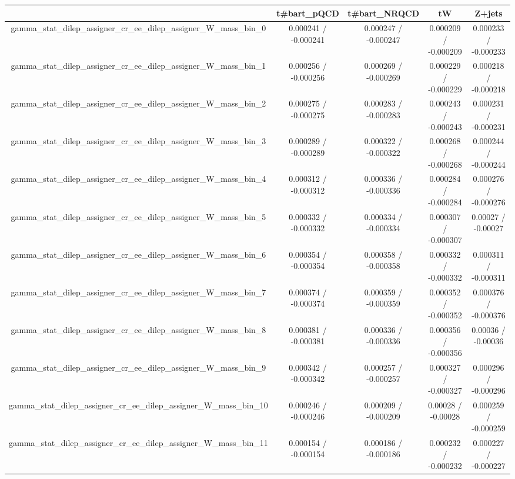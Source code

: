 \documentclass[10pt]{article}
\begin{document}
\begin{table}[htbp]
\begin{center}
\begin{tabular}{|c|c|c|c|c|}
\hline 
      & t#bar{t}_{pQCD}      & t#bar{t}_{NRQCD}      & tW      & Z+jets \\ 
\hline 
  gamma_stat_dilep_assigner_cr_ee_dilep_assigner_W_mass_bin_0 & 0.000241 / -0.000241 & 0.000247 / -0.000247 & 0.000209 / -0.000209 & 0.000233 / -0.000233 \\ 
  gamma_stat_dilep_assigner_cr_ee_dilep_assigner_W_mass_bin_1 & 0.000256 / -0.000256 & 0.000269 / -0.000269 & 0.000229 / -0.000229 & 0.000218 / -0.000218 \\ 
  gamma_stat_dilep_assigner_cr_ee_dilep_assigner_W_mass_bin_2 & 0.000275 / -0.000275 & 0.000283 / -0.000283 & 0.000243 / -0.000243 & 0.000231 / -0.000231 \\ 
  gamma_stat_dilep_assigner_cr_ee_dilep_assigner_W_mass_bin_3 & 0.000289 / -0.000289 & 0.000322 / -0.000322 & 0.000268 / -0.000268 & 0.000244 / -0.000244 \\ 
  gamma_stat_dilep_assigner_cr_ee_dilep_assigner_W_mass_bin_4 & 0.000312 / -0.000312 & 0.000336 / -0.000336 & 0.000284 / -0.000284 & 0.000276 / -0.000276 \\ 
  gamma_stat_dilep_assigner_cr_ee_dilep_assigner_W_mass_bin_5 & 0.000332 / -0.000332 & 0.000334 / -0.000334 & 0.000307 / -0.000307 & 0.00027 / -0.00027 \\ 
  gamma_stat_dilep_assigner_cr_ee_dilep_assigner_W_mass_bin_6 & 0.000354 / -0.000354 & 0.000358 / -0.000358 & 0.000332 / -0.000332 & 0.000311 / -0.000311 \\ 
  gamma_stat_dilep_assigner_cr_ee_dilep_assigner_W_mass_bin_7 & 0.000374 / -0.000374 & 0.000359 / -0.000359 & 0.000352 / -0.000352 & 0.000376 / -0.000376 \\ 
  gamma_stat_dilep_assigner_cr_ee_dilep_assigner_W_mass_bin_8 & 0.000381 / -0.000381 & 0.000336 / -0.000336 & 0.000356 / -0.000356 & 0.00036 / -0.00036 \\ 
  gamma_stat_dilep_assigner_cr_ee_dilep_assigner_W_mass_bin_9 & 0.000342 / -0.000342 & 0.000257 / -0.000257 & 0.000327 / -0.000327 & 0.000296 / -0.000296 \\ 
  gamma_stat_dilep_assigner_cr_ee_dilep_assigner_W_mass_bin_10 & 0.000246 / -0.000246 & 0.000209 / -0.000209 & 0.00028 / -0.00028 & 0.000259 / -0.000259 \\ 
  gamma_stat_dilep_assigner_cr_ee_dilep_assigner_W_mass_bin_11 & 0.000154 / -0.000154 & 0.000186 / -0.000186 & 0.000232 / -0.000232 & 0.000227 / -0.000227 \\ 

\end{tabular}
\end{center}
\end{table}
\end{document}
